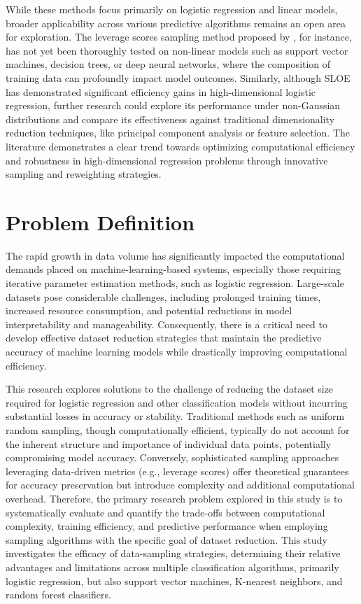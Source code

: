 \documentclass{article}
\theoremstyle{plain}
\theoremstyle{definition}
\theoremstyle{remark}
\begin{document}
While these methods focus primarily on logistic regression and linear models, broader applicability across various predictive algorithms remains an open area for exploration. The leverage scores sampling method proposed by \citeauthor{chow24}, for instance, has not yet been thoroughly tested on non-linear models such as support vector machines, decision trees, or deep neural networks, where the composition of training data can profoundly impact model outcomes. Similarly, although SLOE has demonstrated significant efficiency gains in high-dimensional logistic regression, further research could explore its performance under non-Gaussian distributions and compare its effectiveness against traditional dimensionality reduction techniques, like principal component analysis or feature selection. The literature demonstrates a clear trend towards optimizing computational efficiency and robustness in high-dimensional regression problems through innovative sampling and reweighting strategies.


\section{Problem Definition}

The rapid growth in data volume has significantly impacted the computational demands placed on machine-learning-based systems, especially those requiring iterative parameter estimation methods, such as logistic regression. Large-scale datasets pose considerable challenges, including prolonged training times, increased resource consumption, and potential reductions in model interpretability and manageability. Consequently, there is a critical need to develop effective dataset reduction strategies that maintain the predictive accuracy of machine learning models while drastically improving computational efficiency.

This research explores solutions to the challenge of reducing the dataset size required for logistic regression and other classification models without incurring substantial losses in accuracy or stability. Traditional methods such as uniform random sampling, though computationally efficient, typically do not account for the inherent structure and importance of individual data points, potentially compromising model accuracy. Conversely, sophisticated sampling approaches leveraging data-driven metrics (e.g., leverage scores) offer theoretical guarantees for accuracy preservation but introduce complexity and additional computational overhead. Therefore, the primary research problem explored in this study is to systematically evaluate and quantify the trade-offs between computational complexity, training efficiency, and predictive performance when employing sampling algorithms with the specific goal of dataset reduction. This study investigates the efficacy of data-sampling strategies, determining their relative advantages and limitations across multiple classification algorithms, primarily logistic regression, but also support vector machines, K-nearest neighbors, and random forest classifiers.
\end{document}

